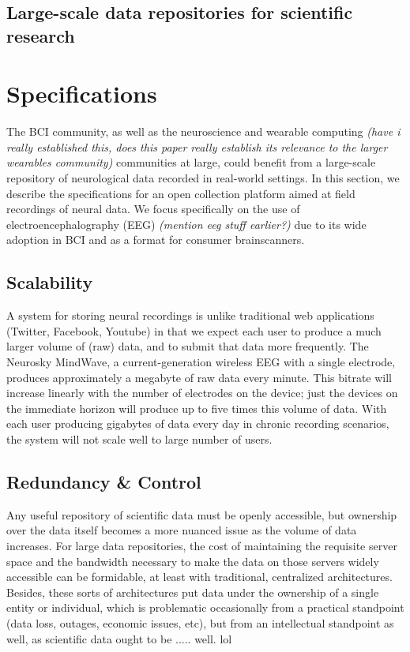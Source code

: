 \documentclass[a4paper,twoside]{article}
\begin{document}
\subsection{Large-scale data repositories for scientific research}








\section{Specifications}

The BCI community, as well as the neuroscience and wearable computing \textit{(have i really established this, does this paper really establish its relevance to the larger wearables community)} communities at large, could benefit from a large-scale repository of neurological data recorded in real-world settings. In this section, we describe the specifications for an open collection platform aimed at field recordings of neural data. We focus specifically on the use of electroencephalography (EEG) \textit{(mention eeg stuff earlier?)} due to its wide adoption in BCI and as a format for consumer brainscanners.

\subsection{Scalability}

A system for storing neural recordings is unlike traditional web applications (Twitter, Facebook, Youtube) in that we expect each user to produce a much larger volume of (raw) data, and to submit that data more frequently. The Neurosky MindWave, a current-generation wireless EEG with a single electrode, produces approximately a megabyte of raw data every minute. This bitrate will increase linearly with the number of electrodes on the device; just the devices on the immediate horizon will produce up to five times this volume of data. With each user producing gigabytes of data every day in chronic recording scenarios, the system will not scale well to large number of users.

\subsection{Redundancy \& Control}

Any useful repository of scientific data must be openly accessible, but ownership over the data itself becomes a more nuanced issue as the volume of data increases. For large data repositories, the cost of maintaining the requisite server space and the bandwidth necessary to make the data on those servers widely accessible can be formidable, at least with traditional, centralized architectures. Besides, these sorts of architectures put data under the ownership of a single entity or individual, which is problematic occasionally from a practical standpoint (data loss, outages, economic issues, etc), but from an intellectual standpoint as well, as scientific data ought to be ..... well. lol
\end{document}
